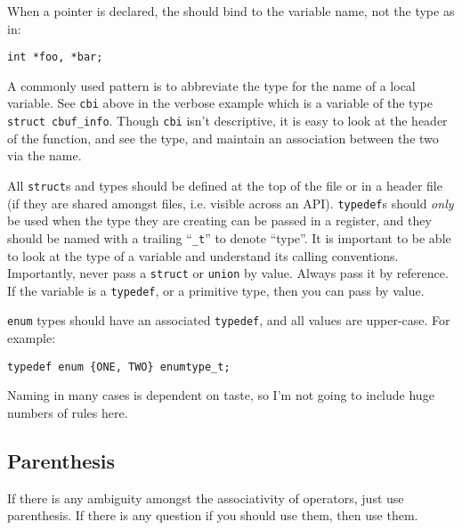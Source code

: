 \documentclass[11pt,onecolumn]{article}
\newcommand{\head}[1]{\vspace{0.4em}\noindent{\bf #1}}
\begin{document}
When a pointer is declared, the {\tt *} should bind to the variable
name, not the type as in:

    \begin{minipage}{3in}
      \footnotesize
      \lstset{language=C}
      \begin{lstlisting}
int *foo, *bar;
      \end{lstlisting}
    \end{minipage}

A commonly used pattern is to abbreviate the type for the name of a
local variable.  See {\tt cbi} above in the verbose example which is a
variable of the type {\tt struct cbuf\_info}.  Though {\tt cbi} isn't
descriptive, it is easy to look at the header of the function, and see
the type, and maintain an association between the two via the name.

\head{Type naming and usage.} All {\tt struct}s and types should be
defined at the top of the file or in a header file (if they are shared
amongst files, i.e. visible across an API).  {\tt typedef}s should
{\em only} be used when the type they are creating can be passed in a
register, and they should be named with a trailing ``{\tt \_t}'' to
denote ``type''.  It is important to be able to look at the type of a
variable and understand its calling conventions.  Importantly, never
pass a {\tt struct} or {\tt union} by value.  Always pass it by
reference.  If the variable is a {\tt typedef}, or a primitive type,
then you can pass by value.

{\tt enum} types should have an associated {\tt typedef}, and all
values are upper-case.  For example:

    \begin{minipage}{3in}
      \footnotesize
      \lstset{language=C}
      \begin{lstlisting}
typedef enum {ONE, TWO} enumtype_t;
      \end{lstlisting}
    \end{minipage}

Naming in many cases is dependent on taste, so I'm not going to
include huge numbers of rules here.

\subsection{Parenthesis}

If there is any ambiguity amongst the associativity of operators, just
use parenthesis.  If there is any question if you should use them,
then use them.
\end{document}
